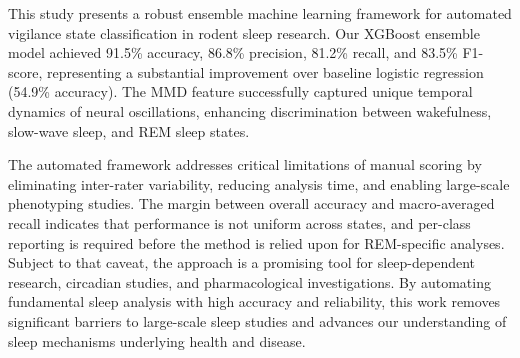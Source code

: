 \documentclass[letterpaper]{article} %
\begin{document}
This study presents a robust ensemble machine learning framework for automated vigilance state classification in rodent sleep research. Our XGBoost ensemble model achieved 91.5\% accuracy, 86.8\% precision, 81.2\% recall, and 83.5\% F1-score, representing a substantial improvement over baseline logistic regression (54.9\% accuracy). The MMD feature successfully captured unique temporal dynamics of neural oscillations, enhancing discrimination between wakefulness, slow-wave sleep, and REM sleep states.

The automated framework addresses critical limitations of manual scoring by eliminating inter-rater variability, reducing analysis time, and enabling large-scale phenotyping studies. The margin between overall accuracy and macro-averaged recall indicates that performance is not uniform across states, and per-class reporting is required before the method is relied upon for REM-specific analyses. %
Subject to that caveat, the approach is a promising tool for sleep-dependent research, circadian studies, and pharmacological investigations. By automating fundamental sleep analysis with high accuracy and reliability, this work removes significant barriers to large-scale sleep studies and advances our understanding of sleep mechanisms underlying health and disease.



% 
\end{document}
